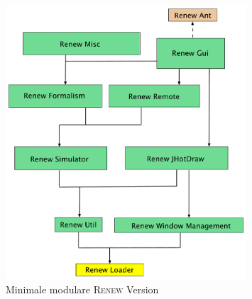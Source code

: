 	\begin{figure}[h!]
	  \centering
	  \includegraphics[width=0.8\textwidth]{material/images/renew_plugin_dependencies-migrate_opt.pdf}
	  \caption{Minimale modulare \textsc{Renew} Version}
	  \label{fig:trans_config}
	\end{figure}
